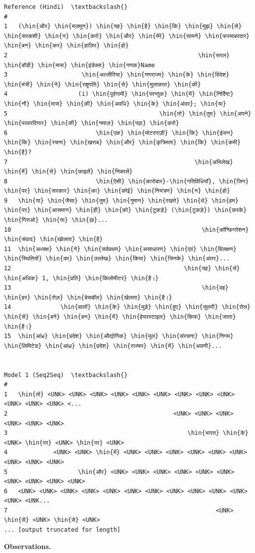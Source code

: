 \documentclass[12pt,a4paper,oneside]{report}
\newcommand{\hin}[1]{{\hinfont #1}}
\begin{document}
\begin{Verbatim}[commandchars=\\\{\},breaklines=true,breakanywhere=true,fontsize=\scriptsize,frame=leftline,framesep=2mm,rulecolor=\color{gray}]
                                                                  Reference (Hindi)  \textbackslash{}
#
1   (\hin{और} \hin{मज़मून}) \hin{यह} \hin{है} \hin{कि} \hin{मुझ} \hin{से} \hin{सरकशी} \hin{न} \hin{करो} \hin{और} \hin{मेरे} \hin{सामने} \hin{फरमाबरदार} \hin{बन} \hin{कर} \hin{हाज़िर} \hin{हो}
2                                                      \hin{सरल} \hin{बॉडी} \hin{मास} \hin{इंडेक्स} \hin{गणक}Name
3                     \hin{अल्जीरिया} \hin{गणराज्य} \hin{के} \hin{विदेश} \hin{मंत्री} \hin{ने} \hin{राष्ट्रपति} \hin{से} \hin{मुलाकात} \hin{की}
4                    (i) \hin{पूर्वगामी} \hin{परन्तुक} \hin{में} \hin{निर्दिष्ट} \hin{नौ} \hin{मास} \hin{की} \hin{अवधि} \hin{के} \hin{अंदर}; \hin{या}
5                                           \hin{तो} \hin{तुम} \hin{अपने} \hin{परवरदिगार} \hin{की} \hin{नमाज़} \hin{पढ़ा} \hin{करो}
6                         \hin{एक} \hin{मोटरगाड़ी} \hin{कि} \hin{इंजन} \hin{कि} \hin{रचना} \hin{खराब} \hin{और} \hin{कृत्रिमता} \hin{कि} \hin{कमी} \hin{है}?
7                                                     \hin{अभिलेख} \hin{में} \hin{से} \hin{फ़ाइलें} \hin{निकालें}
8                         \hin{ऐसी} \hin{कारोबार}-\hin{गतिविधियाँ}, \hin{जिन} \hin{पर} \hin{सरकार} \hin{का} \hin{कोई} \hin{नियंत्रण} \hin{न} \hin{हो}
9   \hin{या} \hin{जैसा} \hin{तुम} \hin{गुमान} \hin{रखते} \hin{थे} \hin{हम} \hin{पर} \hin{आसमान} \hin{ही} \hin{को} \hin{टुकड़े} (\hin{टुकड़े}) \hin{करके} \hin{गिराओ} \hin{या} \hin{ख़}...
10                                                      \hin{कॉन्फ़िगरेशन} \hin{संवाद} \hin{खोलता} \hin{है}
11  \hin{अध्यक्ष} \hin{ने} \hin{सर्वप्रथम} \hin{असाधारण} \hin{एवं} \hin{विलक्षण} \hin{स्थितियों} \hin{का} \hin{उल्लेख} \hin{किया} \hin{जिनके} \hin{अंतर}...
12                                                 \hin{यह} \hin{से} \hin{अधिक} 1, \hin{प्रति} \hin{किलोमीटर} \hin{है।}
13                                                      \hin{वह} \hin{हर} \hin{रोज़} \hin{बेसबॉल} \hin{खेलता} \hin{है।}
14              \hin{बालों} \hin{के} \hin{मुड़े} \hin{हुए} \hin{जूलरी} \hin{रोल} \hin{से} \hin{बने} \hin{बन} \hin{में} \hin{हेयरस्टाइल} \hin{किया} \hin{जाता} \hin{है।}
15  \hin{आंध्र} \hin{प्रदेश} \hin{औद्योगिक} \hin{मूल} \hin{संरचना} \hin{निगम} \hin{लिमिटेड} \hin{आंध्र} \hin{प्रदेश} \hin{राज्यप} \hin{में} \hin{अग्रणी}...

                                                                  Model 1 (Seq2Seq)  \textbackslash{}
#
1   \hin{तो} <UNK> <UNK> <UNK> <UNK> <UNK> <UNK> <UNK> <UNK> <UNK> <UNK> <UNK> <UNK> <...
2                                               <UNK> <UNK> <UNK> <UNK> <UNK> <UNK>
3                                                   \hin{भारत} \hin{के} <UNK> \hin{पर} <UNK> \hin{पर} <UNK>
4             <UNK> <UNK> \hin{में} <UNK> <UNK> <UNK> <UNK> <UNK> <UNK> <UNK> <UNK> <UNK>
5                    \hin{और} <UNK> <UNK> <UNK> <UNK> <UNK> <UNK> <UNK> <UNK> <UNK> <UNK>
6   <UNK> <UNK> <UNK> <UNK> <UNK> <UNK> <UNK> <UNK> <UNK> <UNK> <UNK> <UNK> <UNK...
7                                                           <UNK> \hin{से} <UNK> \hin{से} <UNK>
... [output truncated for length]
\end{Verbatim}
\textbf{Observations.}
\end{document}
